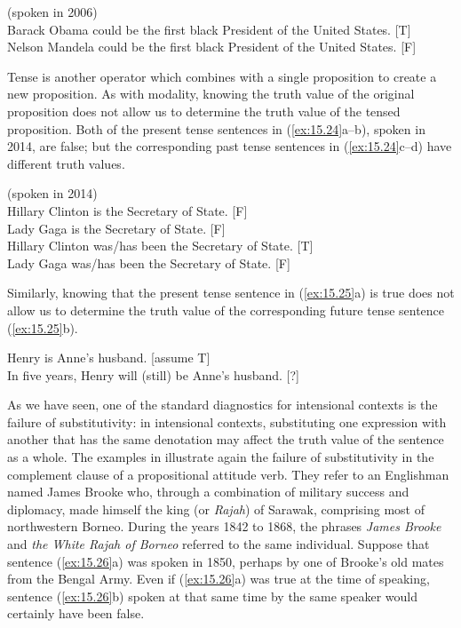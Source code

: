 \ea \label{ex:15.23}
(spoken in 2006)\\
\ea \label{ex:15.} Barack Obama could be the first black President of the United States. \hfill  [T]\\
\ex Nelson Mandela could be the first black President of the United States. \hfill  [F]
                       \z
\z


Tense is another operator which combines with a single proposition to create a new proposition. As with modality, knowing the truth value of the original proposition does not allow us to determine the truth value of the tensed proposition. Both of the present tense sentences in (\ref{ex:15.24}a--b), spoken in 2014, are false; but the corresponding past tense sentences in (\ref{ex:15.24}c--d) have different truth values.


\ea \label{ex:15.24}
(spoken in 2014)\\
\ea \label{ex:15.} Hillary Clinton is the Secretary of State.  [F]\\
\ex Lady Gaga is the Secretary of State.  [F]\\
\ex Hillary Clinton was/has been the Secretary of State.  [T]\\
\ex Lady Gaga was/has been the Secretary of State.  [F]
                       \z
\z


Similarly, knowing that the present tense sentence in (\ref{ex:15.25}a) is true does not allow us to determine the truth value of the corresponding future tense sentence (\ref{ex:15.25}b).


\ea \label{ex:15.25}
\ea \label{ex:15.} Henry is Anne’s husband. \hfill [assume T]\\
\ex In five years, Henry will (still) be Anne’s husband.  \hfill [?]
                       \z
\z


As we have seen, one of the standard diagnostics for intensional contexts is the failure of substitutivity: in intensional contexts, substituting one expression with another that has the same denotation may affect the truth value of the sentence as a whole. The examples in  illustrate again the failure of substitutivity in the complement clause of a propositional attitude verb. They refer to an Englishman named James Brooke who, through a combination of military success and diplomacy, made himself the king (or \textit{Rajah}) of Sarawak, comprising most of northwestern Borneo. During the years 1842 to 1868, the phrases \textit{James Brooke} and \textit{the White Rajah of Borneo} referred to the same individual. Suppose that sentence (\ref{ex:15.26}a) was spoken in 1850, perhaps by one of Brooke’s old mates from the Bengal Army. Even if (\ref{ex:15.26}a) was true at the time of speaking, sentence (\ref{ex:15.26}b) spoken at that same time by the same speaker would certainly have been false.


